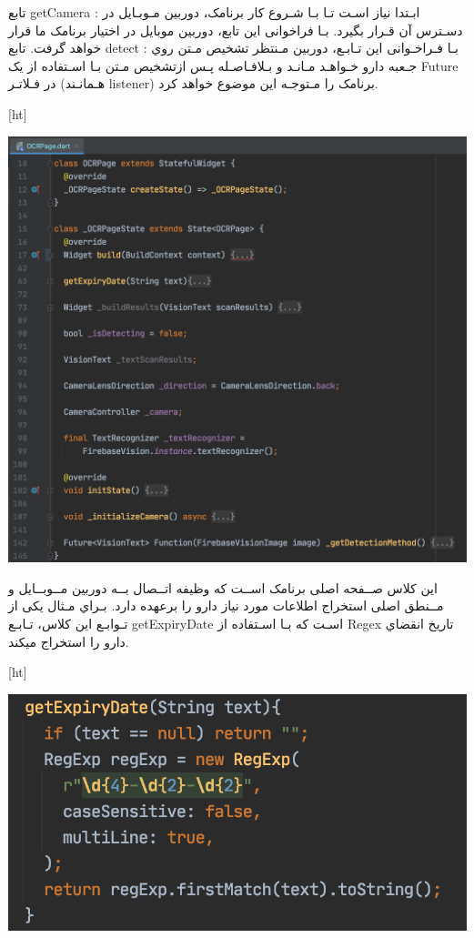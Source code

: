 تابع getCamera : ابـتدا نیاز اسـت تـا بـا شـروع کار برنامک، دوربین مـوبـایل در دسـترس آن قـرار بگیرد. بـا فراخوانی این تابع، دوربین موبایل در اختیار برنامک ما قرار خواهد گرفت.
تابع detect : بـا فـراخـوانی این تـابـع، دوربین مـنتظر تشخیص مـتن روي جـعبه دارو خـواهـد مـانـد و بـلافـاصـله پـس ازتشخیص مـتن بـا اسـتفاده از یک Future در فـلاتـر (هـمانـند listener) برنامک را مـتوجـه این موضوع خواهد کرد.

[ht]
\begin{center}
\includegraphics[scale=0.6]{front/template/images/ocr-page.png}
\end{center}
این کلاس صــفحه اصلی برنامک اســت که وظیفه اتــصال بــه دوربین مــوبــایل و مــنطق اصلی استخراج اطلاعات مورد نیاز دارو را برعهده دارد.
بـراي مـثال یکی از تـوابـع این کلاس، تـابـع getExpiryDate اسـت که بـا اسـتفاده از Regex تاریخ انقضاي دارو را استخراج میکند.

[ht]
\begin{center}
\includegraphics[scale=0.6]{front/template/images/get-expiry-date.png}
\end{center}

